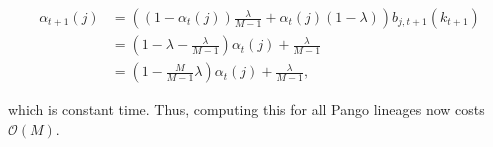\documentclass[11pt,oneside,letterpaper]{article}
\renewcommand{\thefigure}{S\arabic{figure}}
\renewcommand{\thetable}{S\arabic{table}}
\begin{document}
\begin{align*}
    \alpha_{t+1}(j) &= \left(\left(1-\alpha_t(j)\right)\frac{\lambda}{M-1} + \alpha_{t}(j)(1-\lambda)\right)b_{j,t+1}(k_{t+1}) \\
    &= \left(1-\lambda-\frac{\lambda}{M-1}\right)\alpha_t(j)+\frac{\lambda}{M-1} \\
    &= \left(1-\frac{M}{M-1}\lambda\right)\alpha_t(j)+\frac{\lambda}{M-1},
\end{align*}

which is constant time. Thus, computing this for all Pango lineages now costs $\mathcal{O}(M)$. 





% 
% 
\end{document}
